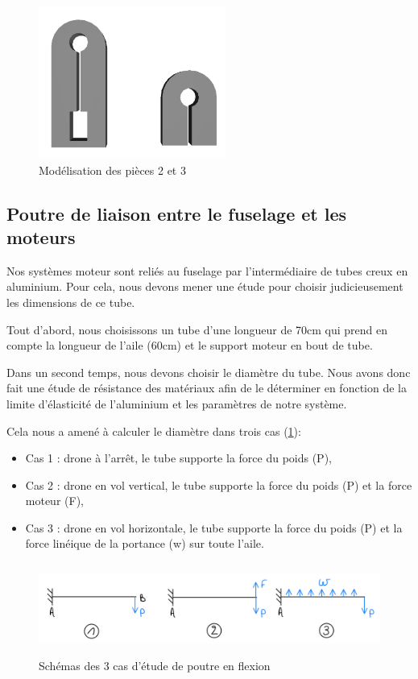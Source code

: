 \documentclass[a4paper,12pt,french]{report}
\begin{document}
\begin{figure}[h]
    \centering
    \includegraphics[height=5cm]{figures/mot2.png}
    \caption{Modélisation des pièces 2 et 3}
\end{figure}

\newpage
\subsection{Poutre de liaison entre le fuselage et les moteurs}

Nos systèmes moteur sont reliés au fuselage par l'intermédiaire de tubes creux en aluminium. Pour cela, nous devons mener une étude pour choisir judicieusement les dimensions de ce tube.\newline

Tout d'abord, nous choisissons un tube d'une longueur de 70cm qui prend en compte la longueur de l'aile (60cm) et le support moteur en bout de tube.\newline

Dans un second temps, nous devons choisir le diamètre du tube. Nous avons donc fait une étude de résistance des matériaux afin de le déterminer en fonction de la limite d'élasticité de l'aluminium et les paramètres de notre système.\newline

Cela nous a amené à calculer le diamètre dans trois cas (\ref{flex}):
\begin{itemize}
    \item Cas 1 : drone à l'arrêt, le tube supporte la force du poids (P),
    \item Cas 2 : drone en vol vertical, le tube supporte la force du poids (P) et la force moteur (F),
    \item Cas 3 : drone en vol horizontale, le tube supporte la force du poids (P) et la force linéique de la portance (w) sur toute l'aile.
\end{itemize}

\begin{figure}[h]
    \centering
    \includegraphics[height=3cm]{figures/flexion.jpeg}
    \caption{Schémas des 3 cas d'étude de poutre en flexion}
    \label{flex}
\end{figure}
\end{document}

